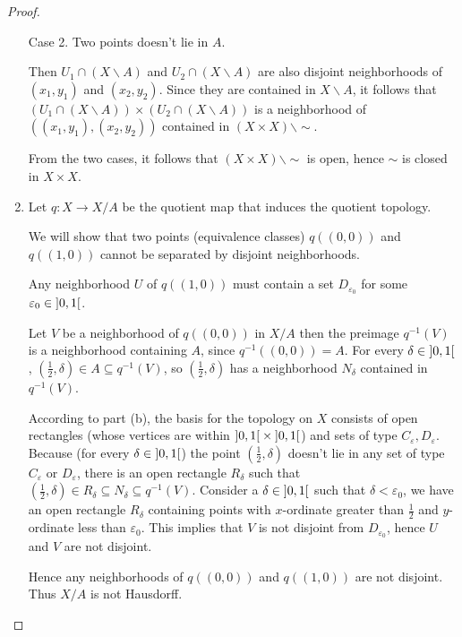 \begin{proof}
\begin{enumerate}[label={(\alph*)}]
		      Case 2. Two points doesn't lie in $A$.

		      Then $U_{1}\cap (X\smallsetminus A)$ and $U_{2} \cap (X\smallsetminus A)$ are also disjoint neighborhoods of $(x_{1}, y_{1})$ and $(x_{2}, y_{2})$. Since they are contained in $X\smallsetminus A$, it follows that $(U_{1}\cap (X\smallsetminus A)) \times (U_{2}\cap (X\smallsetminus A))$ is a neighborhood of $\left((x_{1}, y_{1}), (x_{2}, y_{2})\right)$ contained in $(X\times X)\smallsetminus\sim$.

		      From the two cases, it follows that $(X\times X)\smallsetminus\sim$ is open, hence $\sim$ is closed in $X\times X$.
		\item Let $q: X \to X/A$ be the quotient map that induces the quotient topology.

		      We will show that two points (equivalence classes) $q((0, 0))$ and $q((1, 0))$ cannot be separated by disjoint neighborhoods.

		      Any neighborhood $U$ of $q((1, 0))$ must contain a set $D_{\varepsilon_{0}}$ for some $\varepsilon_{0} \in \left]{0,1}\right[$.

		      Let $V$ be a neighborhood of $q((0, 0))$ in $X/A$ then the preimage $q^{-1}(V)$ is a neighborhood containing $A$, since $q^{-1}((0, 0)) = A$. For every $\delta \in \left]{0,1}\right[$, $\left(\frac{1}{2}, \delta\right) \in A \subseteq q^{-1}(V)$, so $\left(\frac{1}{2}, \delta\right)$ has a neighborhood $N_{\delta}$ contained in $q^{-1}(V)$.

		      According to part (b), the basis for the topology on $X$ consists of open rectangles (whose vertices are within $\left]{0,1}\right[\times\left]{0,1}\right[$) and sets of type $C_{\varepsilon}, D_{\varepsilon}$. Because (for every $\delta \in \left]{0,1}\right[$) the point $\left(\frac{1}{2}, \delta\right)$ doesn't lie in any set of type $C_{\varepsilon}$ or $D_{\varepsilon}$, there is an open rectangle $R_{\delta}$ such that $\left(\frac{1}{2}, \delta\right) \in R_{\delta} \subseteq N_{\delta} \subseteq q^{-1}(V)$. Consider a $\delta \in \left]{0, 1}\right[$ such that $\delta < \varepsilon_{0}$, we have an open rectangle $R_{\delta}$ containing points with $x$-ordinate greater than $\frac{1}{2}$ and $y$-ordinate less than $\varepsilon_{0}$. This implies that $V$ is not disjoint from $D_{\varepsilon_{0}}$, hence $U$ and $V$ are not disjoint.

		      Hence any neighborhoods of $q((0, 0))$ and $q((1, 0))$ are not disjoint. Thus $X/A$ is not Hausdorff.
	\end{enumerate}
\end{proof}

